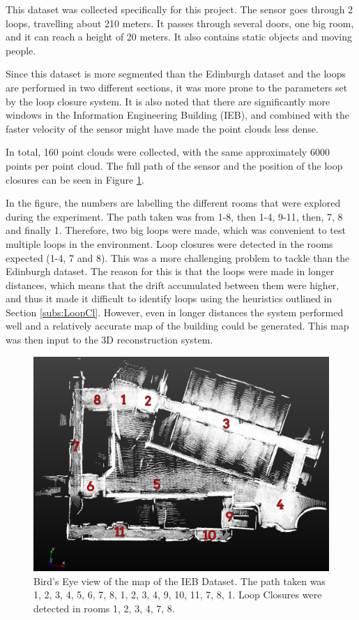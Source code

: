 \documentclass[12pt]{article}
\begin{document}
This dataset was collected specifically for this project. The sensor goes through 2 loops, travelling about 210 meters. It passes through several doors, one big room, and it can reach a height of 20 meters. It also contains static objects and moving people.
	
Since this dataset is more segmented than the Edinburgh dataset and the loops are performed in two different sections, it was more prone to the parameters set by the loop closure system. It is also noted that there are significantly more windows in the Information Engineering Building (IEB), and combined with the faster velocity of the sensor might have made the point clouds less dense. 
	
In total, 160 point clouds were collected, with the same approximately 6000 points per point cloud. The full path of the sensor and the position of the loop closures can be seen in Figure \ref{fig:TopViewIEBDataset}.
	
In the figure, the numbers are labelling the different rooms that were explored during the experiment. The path taken was from 1-8, then 1-4, 9-11, then, 7, 8 and finally 1. Therefore, two big loops were made, which was convenient to test multiple loops in the environment. Loop closures were detected in the rooms expected (1-4, 7 and 8). This was a more challenging problem to tackle than the Edinburgh dataset. The reason for this is that the loops were made in longer distances, which means that the drift accumulated between them were higher, and thus it made it difficult to identify loops using the heuristics outlined in Section \ref{subs:LoopCl}. However, even in longer distances the system performed well and a relatively accurate map of the building could be generated. This map was then input to the 3D reconstruction system. 
	
\begin{figure}[h]
\centering
\includegraphics[width=0.8\linewidth]{Maps2/TopViewMarked}
\caption{Bird's Eye view of the map of the IEB Dataset. The path taken was 1, 2, 3, 4, 5, 6, 7, 8, 1, 2, 3, 4, 9, 10, 11, 7, 8, 1. Loop Closures were detected in rooms 1, 2, 3, 4, 7, 8.}
\label{fig:TopViewIEBDataset}
\end{figure}
\end{document}
